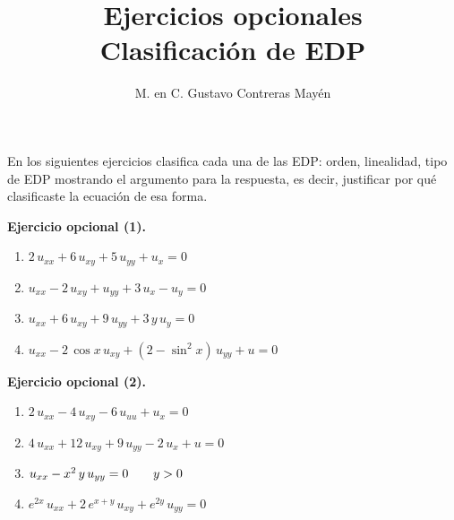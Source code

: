 
\title{Ejercicios opcionales \\[0.3em]  \large{Clasificación de EDP} \vspace{-3ex}}
\author{M. en C. Gustavo Contreras Mayén}
\date{ }


\vspace{-4cm}
\maketitle
\fontsize{14}{14}\selectfont


En los siguientes ejercicios clasifica cada una de las EDP: orden, linealidad, tipo de EDP mostrando el argumento para la respuesta, es decir, justificar por qué clasificaste la ecuación de esa forma.

\textbf{Ejercicio opcional (1).}

\begin{enumerate}[label=\roman*)]
\item \Large{$2 \, u_{xx} + 6 \, u_{xy} + 5 \, u_{yy} + u_{x} = 0$} \label{item2}
\item $u_{xx} - 2 \, u_{xy} + u_{yy} + 3 \, u_{x} - u_{y} = 0$ \label{item3}
\item $u_{xx} + 6 \, u_{xy} + 9 \, u_{yy} + 3 \, y \, u_{y} = 0$ \label{item5}
\item $u_{xx} - 2 \, \cos x \, u_{xy} +  (2 - \sin^{2} x) \, u_{yy} + u = 0$ \label{item7}
\end{enumerate}
\textbf{Ejercicio opcional (2).}
\begin{enumerate}[label=\roman*), resume]
\item \Large{$2 \, u_{xx} - 4\, u_{xy} - 6 \, u_{uu} + u_{x} = 0$}
\item $4 \, u_{xx} + 12 \, u_{xy} + 9 \, u_{yy} - 2 \, u_{x} + u = 0$
\item $u_{xx} - x^{2}\, y \, u_{yy} = 0 \hspace{0.7cm} y > 0$
\item $e^{2x} \, u_{xx} + 2 \, e^{x+y} \, u_{xy} + e^{2y} \, u_{yy} = 0$
\end{enumerate}
